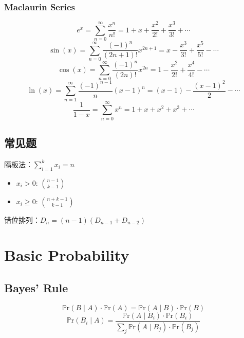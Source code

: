 \documentclass[9pt,landscape]{article}
\begin{document}
\begin{multicols}{3}
\subsubsection{Maclaurin Series}

\begin{equation*}
	e^x = \sum_{n=0}^{\infty} \frac{x^n}{n!} = 1 + x + \frac{x^2}{2!} + \frac{x^3}{3!} + \cdots
\end{equation*}
\begin{equation*}
	\sin(x) = \sum_{n=0}^{\infty} \frac{(-1)^n}{(2n+1)!}x^{2n+1} = x - \frac{x^3}{3!} + \frac{x^5}{5!} - \cdots
\end{equation*}
\begin{equation*}
	\cos(x) = \sum_{n=0}^{\infty} \frac{(-1)^n}{(2n)!}x^{2n} = 1 - \frac{x^2}{2!} + \frac{x^4}{4!} - \cdots
\end{equation*}
\begin{equation*}
	\ln(x) = \sum_{n=1}^{\infty} \frac{(-1)^{n-1}}{n}(x-1)^n = (x-1) - \frac{(x-1)^2}{2} - \cdots
\end{equation*}
\begin{equation*}
	\frac{1}{1-x} = \sum_{n=0}^{\infty} x^n = 1 + x + x^2 + x^3 + \cdots
\end{equation*}

\subsection{常见题}

隔板法：$\sum_{i=1}^{k} x_i=n$
\begin{itemize}
	\item $x_i>0$: $\binom{n-1}{k-1}$
	\item $x_i\ge 0$: $\binom{n+k-1}{k-1}$
\end{itemize}

错位排列：$D_n=(n-1)\left(D_{n-1}+D_{n-2}\right)$

\section{Basic Probability}

\subsection{Bayes’ Rule}
\begin{equation*}
	\mathbb{P}\mathrm{r}(B\mid A)\cdot\mathbb{P}\mathrm{r}(A)=\mathbb{P}\mathrm{r}(A\mid B)\cdot\mathbb{P}\mathrm{r}(B)
\end{equation*}
\begin{equation*}
	\mathbb{P}\mathrm{r}(B_i\mid A)=\frac{\mathbb{P}\mathrm{r}(A\mid B_i)\cdot \mathbb{P}\mathrm{r}(B_i)}{\sum_j\mathbb{P}\mathrm{r}(A\mid B_j)\cdot \mathbb{P}\mathrm{r}(B_j)}
\end{equation*}


\end{multicols}
\end{document}
